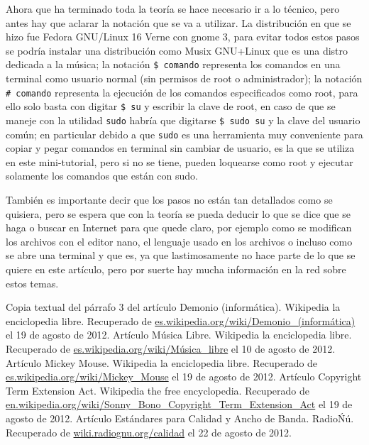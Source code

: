 \begin{multicols}{2}

Ahora que ha terminado toda la teoría se hace necesario ir a lo técnico, pero antes hay que aclarar la notación que se va a utilizar. La distribución en que se hizo fue Fedora GNU/Linux 16 Verne con gnome 3, para evitar todos estos pasos se podría instalar una distribución como Musix GNU+Linux que es una distro dedicada a la música; la notación \verb!$ comando! representa los comandos en una terminal como usuario normal (sin permisos de root o administrador); la notación \verb!# comando! representa la ejecución de los comandos especificados como root, para ello solo basta con digitar \verb!$ su! y escribir la clave de root, en caso de que se maneje con la utilidad \verb!sudo! habría que digitarse \verb!$ sudo su! y la clave del usuario común; en particular debido a que \verb!sudo! es una herramienta muy conveniente para copiar y pegar comandos en terminal sin cambiar de usuario, es la que se utiliza en este mini-tutorial, pero si no se tiene, pueden loquearse como root y ejecutar solamente los comandos que están con sudo.

También es importante decir que los pasos no están tan detallados como se quisiera, pero se espera que con la teoría se pueda deducir lo que se dice que se haga o buscar en Internet para que quede claro, por ejemplo como se modifican los archivos con el editor nano, el lenguaje usado en los archivos o incluso como se abre una terminal y que es, ya que lastimosamente no hace parte de lo que se quiere en este artículo, pero por suerte hay mucha información en la red sobre estos temas.




\begin{bibliografia}
Copia textual del párrafo 3 del artículo Demonio (informática). Wikipedia la enciclopedia libre.
Recuperado de \url{es.wikipedia.org/wiki/Demonio_(informática)} el 19 de agosto de 2012.
Artículo Música Libre. Wikipedia la enciclopedia libre.
Recuperado de \url{es.wikipedia.org/wiki/Música_libre} el 10 de agosto de 2012.
Artículo Mickey Mouse. Wikipedia la enciclopedia libre.
Recuperado de \url{es.wikipedia.org/wiki/Mickey_Mouse} el 19 de agosto de 2012.
Artículo Copyright Term Extension Act. Wikipedia the free encyclopedia.
Recuperado de \url{en.wikipedia.org/wiki/Sonny_Bono_Copyright_Term_Extension_Act} el 19 de agosto de 2012.
Artículo Estándares para Calidad y Ancho de Banda. RadioŃú.
Recuperado de \url{wiki.radiognu.org/calidad} el 22 de agosto de 2012.
\end{bibliografia}



\end{multicols}
